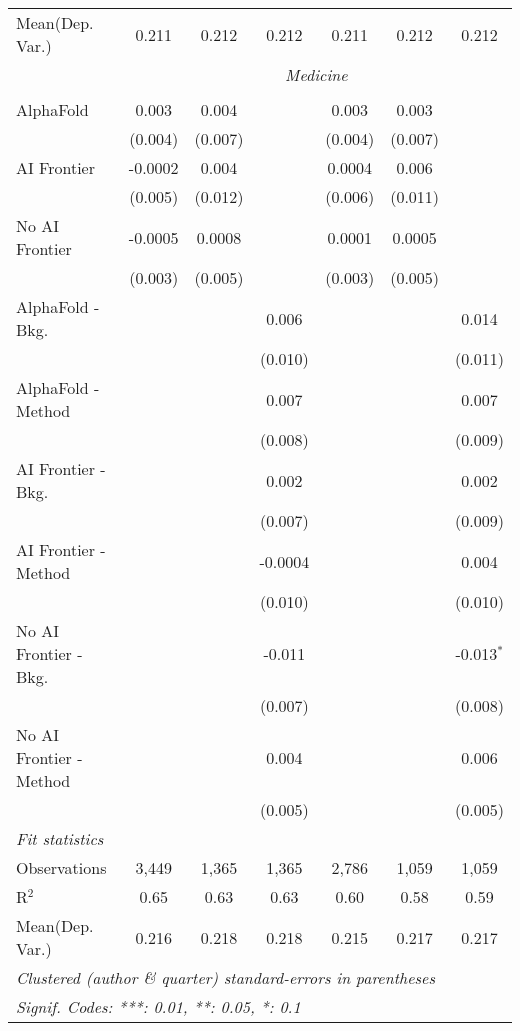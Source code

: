 \begin{tabular}{lcccccc}
Mean(Dep. Var.) & 0.211 & 0.212 & 0.212 & 0.211 & 0.212 & 0.212 \\
 & \multicolumn{6}{c}{\textit{Medicine}} \\ \\
   AlphaFold               & 0.003   & 0.004   &         & 0.003   & 0.003   &   \\   
                           & (0.004) & (0.007) &         & (0.004) & (0.007) &   \\   
   AI Frontier             & -0.0002 & 0.004   &         & 0.0004  & 0.006   &   \\   
                           & (0.005) & (0.012) &         & (0.006) & (0.011) &   \\   
   No AI Frontier          & -0.0005 & 0.0008  &         & 0.0001  & 0.0005  &   \\   
                           & (0.003) & (0.005) &         & (0.003) & (0.005) &   \\   
   AlphaFold - Bkg.        &         &         & 0.006   &         &         & 0.014\\   
                           &         &         & (0.010) &         &         & (0.011)\\   
   AlphaFold - Method      &         &         & 0.007   &         &         & 0.007\\   
                           &         &         & (0.008) &         &         & (0.009)\\   
   AI Frontier - Bkg.      &         &         & 0.002   &         &         & 0.002\\   
                           &         &         & (0.007) &         &         & (0.009)\\   
   AI Frontier - Method    &         &         & -0.0004 &         &         & 0.004\\   
                           &         &         & (0.010) &         &         & (0.010)\\   
   No AI Frontier - Bkg.   &         &         & -0.011  &         &         & -0.013$^{*}$\\   
                           &         &         & (0.007) &         &         & (0.008)\\   
   No AI Frontier - Method &         &         & 0.004   &         &         & 0.006\\   
                           &         &         & (0.005) &         &         & (0.005)\\   
   \midrule
   \emph{Fit statistics}\\
   Observations            & 3,449   & 1,365   & 1,365   & 2,786   & 1,059   & 1,059\\  
   R$^2$                   & 0.65    & 0.63    & 0.63    & 0.60    & 0.58    & 0.59\\  
Mean(Dep. Var.) & 0.216 & 0.218 & 0.218 & 0.215 & 0.217 & 0.217 \\
   \midrule \midrule
   \multicolumn{7}{l}{\emph{Clustered (author \& quarter) standard-errors in parentheses}}\\
   \multicolumn{7}{l}{\emph{Signif. Codes: ***: 0.01, **: 0.05, *: 0.1}}\\
\end{tabular}
\par\endgroup
